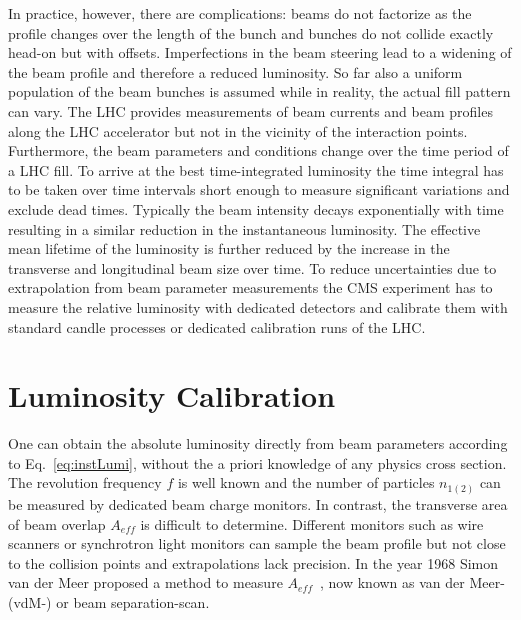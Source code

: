 In practice, however, there are complications: beams do not factorize as the profile changes over the length of the bunch and bunches do not collide exactly head-on but with offsets. Imperfections in the beam steering lead to a widening of the beam profile and therefore a reduced luminosity. So far also a uniform population of the beam bunches is assumed while in reality, the actual fill pattern can vary. The LHC provides measurements of beam currents and beam profiles along the LHC accelerator but not in the vicinity of the interaction points. Furthermore, the beam parameters and conditions change over the time period of a LHC fill. To arrive at the best time-integrated luminosity the time integral has to be taken over time intervals short enough to measure significant variations and exclude dead times. Typically the beam intensity decays exponentially with time resulting in a similar reduction in the instantaneous luminosity. The effective mean lifetime of the luminosity is further reduced by the increase in the transverse and longitudinal beam size over time. To reduce uncertainties due to extrapolation from beam parameter measurements the CMS experiment has to measure the relative luminosity with dedicated detectors and calibrate them with standard candle processes or dedicated calibration runs of the LHC. 




\section {Luminosity Calibration} \label{sec:lumiCalibration}
One can obtain the absolute luminosity directly from beam parameters according to Eq.~\ref{eq:instLumi}, 
without the a priori knowledge of any physics cross section.
The revolution frequency $f$ is well known and the number of particles
$n_{1(2)}$ can be measured by dedicated beam charge monitors.
In contrast, the transverse area of beam overlap $A_{eff}$ is difficult to determine.
Different monitors such as wire scanners or synchrotron light monitors can sample the beam
profile but not close to the collision points and extrapolations lack precision.
In the year 1968 Simon van der Meer proposed a method to measure $A_{eff}$~\cite{vanderMeer:296752}, now  known as van der Meer- (vdM-) or beam separation-scan.

